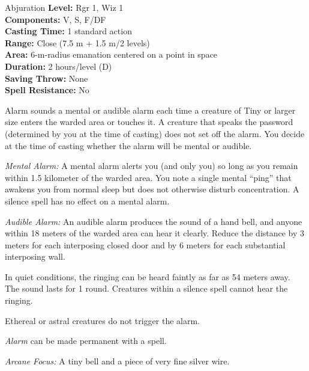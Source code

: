 {Abjuration}
{
	\textbf{Level:}
	Rgr 1, Wiz 1\\
	\textbf{Components:}
	V, S, F/DF\\
	\textbf{Casting Time:}
	1 standard action\\
	\textbf{Range:}
	Close (7.5 m + 1.5 m/2 levels)\\
	\textbf{Area:}
	6-m-radius emanation centered on a point in space\\
	\textbf{Duration:}
	2 hours/level (D)\\
	\textbf{Saving Throw:}
	None\\
	\textbf{Spell Resistance:}
	No\\
}
{
	Alarm sounds a mental or audible alarm each time a creature of Tiny or larger size enters the warded area or touches it. A creature that speaks the password (determined by you at the time of casting) does not set off the alarm. You decide at the time of casting whether the alarm will be mental or audible.

	\textit{Mental Alarm:}
	A mental alarm alerts you (and only you) so long as you remain within 1.5 kilometer of the warded area. You note a single mental ``ping'' that awakens you from normal sleep but does not otherwise disturb concentration. A silence spell has no effect on a mental alarm.

	\textit{Audible Alarm:}
	An audible alarm produces the sound of a hand bell, and anyone within 18 meters of the warded area can hear it clearly. Reduce the distance by 3 meters for each interposing closed door and by 6 meters for each substantial interposing wall.

	In quiet conditions, the ringing can be heard faintly as far as 54 meters away. The sound lasts for 1 round. Creatures within a silence spell cannot hear the ringing.

	Ethereal or astral creatures do not trigger the alarm.

	\emph{Alarm} can be made permanent with a  spell.

	\textit{Arcane Focus:}
	A tiny bell and a piece of very fine silver wire.

}
